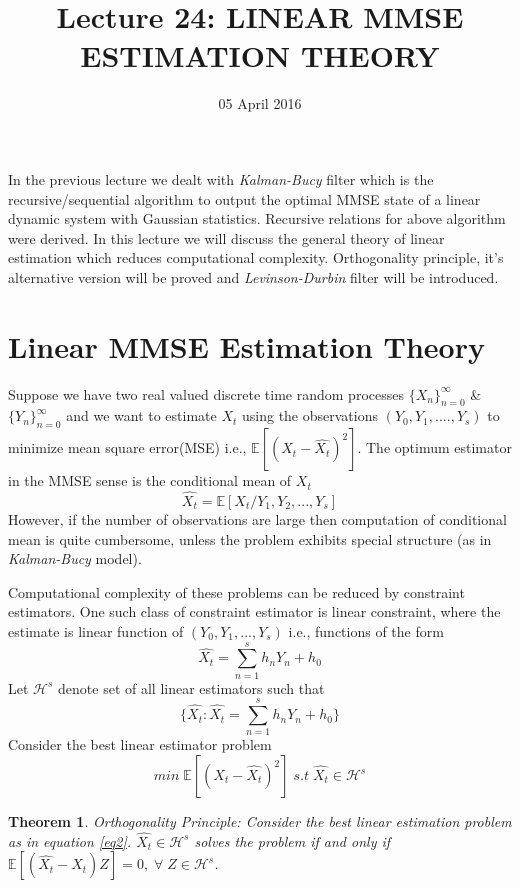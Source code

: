 \documentclass[a4paper,english,12pt]{article}
\newtheorem{theorem}{Theorem}[section]
\begin{document}
\title{Lecture 24: LINEAR MMSE ESTIMATION THEORY}
\author{}
\date{05 April 2016}
\maketitle
In the previous lecture we dealt with \textit{Kalman-Bucy} filter which is the recursive/sequential algorithm to output the optimal MMSE state of a linear dynamic system with Gaussian statistics. Recursive relations for above algorithm were derived. In this lecture we will discuss the general theory of linear estimation which reduces computational complexity. Orthogonality principle, it's alternative version will be proved and \textit{Levinson-Durbin} filter will be introduced. 
\section{Linear MMSE Estimation Theory}
Suppose we have two real valued discrete time random processes 
$\{X_n\}_{n=0}^\infty$ \& $\{Y_n\}_{n=0}^\infty$ and we want to estimate $X_t$ using the observations $(Y_0,Y_1,....,Y_s)$ to minimize mean square error(MSE) i.e., $\mathbb{E}[(X_t-\hat{X_t})^2]$. The optimum estimator in the MMSE sense is  the conditional mean of $X_t$
\begin{equation}
\hat{X_t}=\mathbb{E}[X_t/Y_1,Y_2,...,Y_s]
\end{equation}
However, if the number of observations are large then computation of conditional mean is quite cumbersome, unless the problem exhibits special structure (as in \textit{Kalman-Bucy} model).
\par Computational complexity of these problems can be reduced by constraint estimators. One such class of constraint estimator is linear constraint, where the estimate is linear function of $(Y_0,Y_1,...,Y_s)$ i.e., functions of the form 
\begin{equation}
\hat{X_t}=\sum_{n=1}^s h_nY_n+h_0
\end{equation}
Let $\mathcal{H}^s$ denote set of all linear estimators such that
\begin{equation}
\{\hat{X_t}:\hat{X_t}=\sum_{n=1}^s h_nY_n+h_0\}\label{eq1}
\end{equation}
Consider the best linear estimator problem 
\begin{equation}
\textit{min} \; \mathbb{E}[(X_t-\hat{X_t})^2]\; s.t \; \hat{X_t}\in \mathcal{H}^s \label{eq2}
\end{equation}
\begin{theorem}
Orthogonality Principle:
Consider the best linear estimation problem as in equation \eqref{eq2}. $\hat{X_t}\in \mathcal{H}^s$ solves the problem if and only if \; $\mathbb{E}[(\hat{X_t}-X_t)Z]=0,\;  \forall \; Z \in \mathcal{H}^s$.
\end{theorem}
\end{document}
